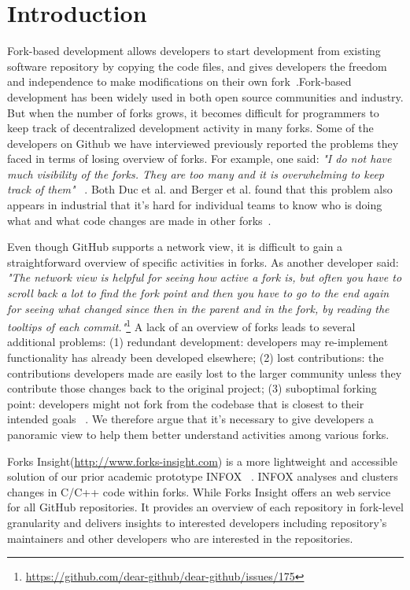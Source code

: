 \section{Introduction}
Fork-based development allows developers to start development from existing software repository by copying the code files, and gives developers the freedom and independence to make modifications on their own fork~\cite{dubinsky2013exploratory, bitzer2006impact, ernst2010code,vetter2007open}.Fork-based development has been widely used in both open source communities and industry. But when the number of forks grows, it becomes difficult for programmers to keep track of decentralized development activity in many forks. Some of the developers on Github we have interviewed previously reported the problems they faced in terms of losing overview of forks. For example, one said: \emph{"I do not have much visibility of the forks. They are too many and it is overwhelming to keep track of them"} ~\cite{ZSLXWK:ICSE18}. Both Duc et al. and Berger et al. found that this problem also appears in industrial that it's hard for individual teams to know who is doing what and what code changes are made in other forks~\cite{berger2014three,Duc:2014:FCM:2652524.2652546}.

Even though GitHub supports a network view, it is difficult to gain a straightforward overview of specific activities in forks. As another developer said: \emph{"The network view is helpful for seeing how active a fork is, but often you have to scroll back a lot to find the fork point and then you have to go to the end again for seeing what changed since then in the parent and in the fork, by reading the tooltips of each commit."}\footnote{\url{https://github.com/dear-github/dear-github/issues/175}}
 A lack of an overview of forks leads to several additional problems: (1) redundant development: developers may re-implement functionality has already been developed elsewhere; (2) lost contributions: the contributions developers made are easily lost to the larger community unless they contribute those changes back to the original project; (3) suboptimal forking point: developers might not fork from the codebase that is closest to their intended goals ~\cite{ZSLXWK:ICSE18, dubinsky2013exploratory,stanciulescu2015forked}. We therefore argue that  it's necessary to give developers a panoramic view to help them better understand activities among various forks.

Forks Insight(\url{http://www.forks-insight.com}) is a more lightweight and accessible solution of our prior academic prototype INFOX ~\cite{ZSLXWK:ICSE18}. INFOX analyses and clusters changes in C/C++ code within forks. While Forks Insight offers an web service for all GitHub repositories. It provides an overview of each repository in fork-level granularity and delivers insights to interested developers including repository's maintainers and other developers who are interested in the repositories.

